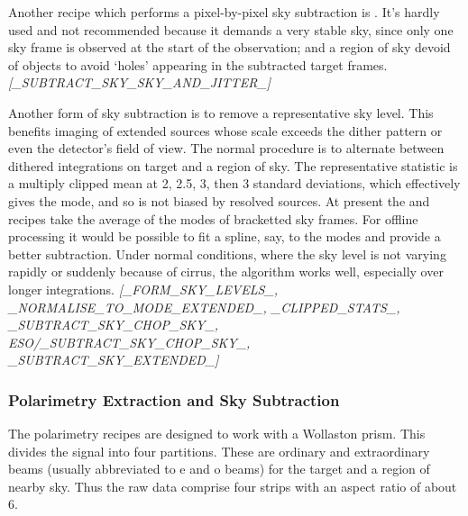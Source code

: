 \documentclass[twoside,11pt,nolof]{starlink}
\begin{document}
Another recipe which performs a pixel-by-pixel sky subtraction is
.  It's hardly used and
not recommended because it demands a very stable sky, since only one
sky frame is observed at the start of the observation; and a region of
sky devoid of objects to avoid `holes' appearing in the subtracted
target frames.
\newline \emph{[\_SUBTRACT\_SKY\_SKY\_AND\_JITTER\_]}

Another form of sky subtraction is to remove a representative sky
level.  This benefits imaging of extended sources whose scale exceeds
the dither pattern or even the detector's field of view.  The normal
procedure is to alternate between dithered integrations on target and
a region of sky.  The representative statistic is a multiply clipped
mean at 2, 2.5, 3, then 3 standard deviations, which effectively gives
the mode, and so is not biased by resolved sources.  At present the
 and
 recipes take the average
of the modes of bracketted sky frames.  For offline processing it
would be possible to fit a spline, say, to the modes and provide a
better subtraction.  Under normal conditions, where the sky level is
not varying rapidly or suddenly because of cirrus, the algorithm works
well, especially over longer integrations.
\newline \emph{[\_FORM\_SKY\_LEVELS\_, \_NORMALISE\_TO\_MODE\_EXTENDED\_,
\_CLIPPED\_STATS\_,\\
\_SUBTRACT\_SKY\_CHOP\_SKY\_, ESO/\_SUBTRACT\_SKY\_CHOP\_SKY\_, \\
\_SUBTRACT\_SKY\_EXTENDED\_]}

\subsubsection{Polarimetry
Extraction and Sky Subtraction\label{polarimetry_extraction_and_sky_subtraction}}

The polarimetry recipes are designed to work with a Wollaston prism.
This divides the signal into four partitions.  These are ordinary and
extraordinary beams (usually abbreviated to e and o beams) for the
target and a region of nearby sky.  Thus the raw data comprise four
strips with an aspect ratio of about 6.
\end{document}
